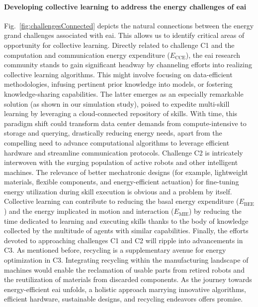 \documentclass[12pt]{article}
\begin{document}
\paragraph*{Developing collective learning to address the energy challenges of \ac{eai}}
Fig.~\ref{fig:challengesConnected} depicts the natural connections between the energy grand challenges associated with \ac{eai}. This allows us to identify critical areas of opportunity for collective learning. Directly related to challenge C1 and the computation and communication energy expenditure ($E_\text{CCE}$), the \ac{eai} research community stands to gain significant headway by channeling efforts into realizing collective learning algorithms. This might involve focusing on data-efficient methodologies, infusing pertinent prior knowledge into models, or fostering knowledge-sharing capabilities. The latter emerges as an especially remarkable solution (as shown in our simulation study), poised to expedite multi-skill learning by leveraging a cloud-connected repository of skills. With time, this paradigm shift could transform data center demands from compute-intensive to storage and querying, drastically reducing energy needs, apart from the compelling need to advance computational algorithms to leverage efficient hardware and streamline communication protocols. Challenge C2 is intricately interwoven with the surging population of active robots and other intelligent machines. The relevance of better mechatronic designs (for example, lightweight materials, flexible components, and energy-efficient actuation) for fine-tuning energy utilization during skill execution is obvious and a problem by itself. Collective learning can contribute to reducing the basal energy expenditure ($E_\text{BEE}$) and the energy implicated in motion and interaction ($E_\text{MIE}$) by reducing the time dedicated to learning and executing skills thanks to the body of knowledge collected by the multitude of agents with similar capabilities. Finally, the efforts devoted to approaching challenges C1 and C2 will ripple into advancements in C3. As mentioned before, recycling is a supplementary avenue for energy optimization in C3. Integrating recycling within the manufacturing landscape of machines would enable the reclamation of usable parts from retired robots and the reutilization of materials from discarded components. As the journey towards energy-efficient \ac{eai} unfolds, a holistic approach marrying innovative algorithms, efficient hardware, sustainable designs, and recycling endeavors offers promise.
\end{document}
